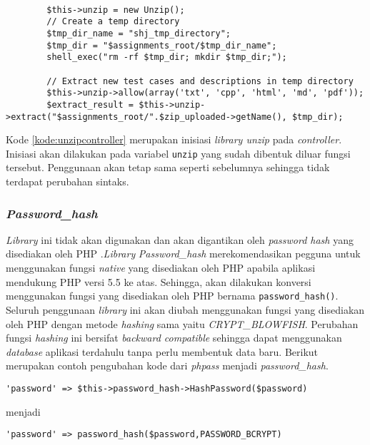 \begin{lstlisting}[caption=Perancangan inisiasi \textit{library unzip} pada \textit{controller}, label=kode:unzipcontroller]

		$this->unzip = new Unzip();
		// Create a temp directory
		$tmp_dir_name = "shj_tmp_directory";
		$tmp_dir = "$assignments_root/$tmp_dir_name";
		shell_exec("rm -rf $tmp_dir; mkdir $tmp_dir;");

		// Extract new test cases and descriptions in temp directory
		$this->unzip->allow(array('txt', 'cpp', 'html', 'md', 'pdf'));
		$extract_result = $this->unzip->extract("$assignments_root/".$zip_uploaded->getName(), $tmp_dir);
\end{lstlisting}

Kode \ref{kode:unzipcontroller} merupakan inisiasi \textit{library unzip} pada \textit{controller}. Inisiasi akan dilakukan pada variabel \texttt{unzip} yang sudah dibentuk diluar fungsi tersebut. Penggunaan akan tetap sama seperti sebelumnya sehingga tidak terdapat perubahan sintaks.

\subsubsection{\textit{Password\_hash}}
\textit{Library} ini tidak akan digunakan dan akan digantikan oleh \textit{password hash} yang disediakan oleh PHP .\textit{Library} \textit{Password\_hash} merekomendasikan pegguna untuk menggunakan fungsi \textit{native} yang disediakan oleh PHP apabila aplikasi mendukung PHP versi 5.5 ke atas. Sehingga, akan dilakukan konversi menggunakan fungsi yang disediakan oleh PHP bernama \texttt{password\_hash()}. Seluruh penggunaan \textit{library} ini akan diubah menggunakan fungsi yang disediakan oleh PHP dengan metode \textit{hashing} sama yaitu \textit{CRYPT\_BLOWFISH}. Perubahan fungsi \textit{hashing} ini bersifat \textit{backward compatible} sehingga dapat menggunakan \textit{database} aplikasi terdahulu tanpa perlu membentuk data baru. Berikut merupakan contoh pengubahan kode dari \textit{phpass} menjadi \textit{password\_hash}.

\begin{center}
\verb|'password' => $this->password_hash->HashPassword($password)|
\end{center}
menjadi
\begin{center}
\verb|'password' => password_hash($password,PASSWORD_BCRYPT)|
\end{center}

